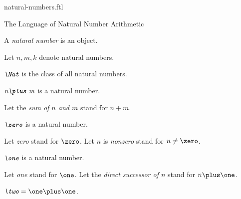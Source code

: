\documentclass{naproche-library}
\begin{document}
\begin{smodule}[title=Natural Numbers]{natural-numbers.ftl}

\begin{sfragment}{The Language of Natural Number Arithmetic}
  \begin{signature}[forthel,id=NatNumberSig]
    A \emph{natural number} is an object.

    Let $n,m,k$ denote natural numbers.
  \end{signature}

  \begin{definition}[forthel,id=NatDef]
    $\emph{\Nat}$ is the class of all natural numbers.
  \end{definition}

  \begin{signature}[forthel,id=PlusSig]
    $\emph{n\plus m}$ is a natural number.

    Let the \emph{sum of $n$ and $m$} stand for $n\plus m$.
  \end{signature}


  \begin{signature}[forthel,id=ZeroSig]
    $\emph{\zero}$ is a natural number.

    Let \emph{zero} stand for $\zero$.
    Let $n$ is \emph{nonzero} stand for $n\neq\zero$.
  \end{signature}


  \begin{signature}[forthel,id=OneSig]
    $\emph{\one}$ is a natural number.

    Let \emph{one} stand for $\one$.
    Let the \emph{direct successor of $n$} stand for $n\plus\one$.
  \end{signature}


  \begin{definition}[forthel,id=TwoSig]
    $\emph{\two}=\one\plus\one$.


\end{definition}
\end{sfragment}
\end{smodule}
\end{document}
